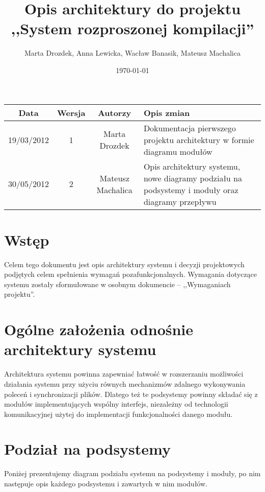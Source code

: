 \documentclass[a4paper]{article}
\title{Opis architektury do projektu ,,System rozproszonej kompilacji''}
\author{Marta Drozdek, Anna Lewicka, Wacław Banasik, Mateusz Machalica}
\date{\today}
\begin{document}
\maketitle

\begin{table}[!h]
	\centering
	\begin{tabular}{|c|c|c|p{8cm}|}
		\hline
		\textbf{Data} & \textbf{Wersja} & \textbf{Autorzy} & \textbf{Opis zmian} \\ \hline
		19/03/2012 & 1 & Marta Drozdek & Dokumentacja pierwszego projektu architektury w formie diagramu modułów \\ \hline
		30/05/2012 & 2 & Mateusz Machalica & Opis architektury systemu, nowe diagramy podziału na podsystemy i moduły oraz diagramy przepływu \\ \hline
	\end{tabular}
\end{table}

\section{Wstęp}

Celem tego dokumentu jest opis architektury systemu i decyzji projektowych podjętych celem spełnienia wymagań pozafunkcjonalnych.
Wymagania dotyczące systemu zostały sformułowane w osobnym dokumencie -- ,,Wymaganiach projektu''.



\section{Ogólne założenia odnośnie architektury systemu}

Architektura systemu powinna zapewniać łatwość w rozszerzaniu możliwości działania systemu przy użyciu równych mechanizmów zdalnego wykonywania poleceń i synchronizacji plików.
Dlatego też te podsystemy powinny składać się z modułów implementujących wspólny interfejs, niezależny od technologii komunikacyjnej użytej do implementacji funkcjonalności danego modułu.

\section{Podział na podsystemy}

Poniżej prezentujemy diagram podziału systemu na podsystemy i moduły, po nim następuje opis każdego podsystemu i zawartych w nim modułów.
\end{document}
